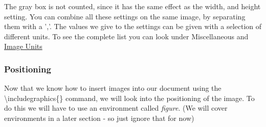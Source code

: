 \documentclass{article}
\newcommand{\jbs}[1]{\textbackslash{}#1} %
\begin{document}
The gray box is not counted, since it has the same effect as the width, and height setting.
You can combine all these settings on the same image, by separating them with a ','. The values we give to the settings 
can be given with a selection of different units. To see the complete list you can look under Miscellaneous and \hyperref[secc:Image-Units]{Image Units}

\subsubsection{Positioning}
Now that we know how to insert images into our document using the \jbs{includegraphics\{\}} command, we will
look into the positioning of the image. To do this we will have to use an environment called \textit{figure}.
(We will cover environments in a later section - so just ignore that for now)
\end{document}
